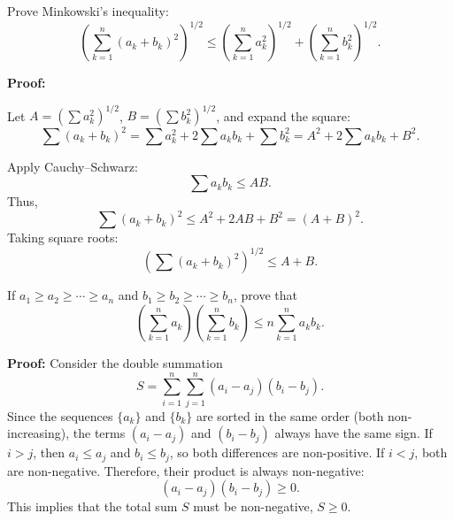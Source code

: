 \begin{problembox}
Prove Minkowski's inequality:
\[
\left( \sum_{k=1}^n (a_k + b_k)^2 \right)^{1/2} \leq \left( \sum_{k=1}^n a_k^2 \right)^{1/2} + \left( \sum_{k=1}^n b_k^2 \right)^{1/2}.
\]
\end{problembox}

\textbf{Proof:}

Let \( A = \left( \sum a_k^2 \right)^{1/2} \), \( B = \left( \sum b_k^2 \right)^{1/2} \), and expand the square:
\[
\sum (a_k + b_k)^2 = \sum a_k^2 + 2\sum a_k b_k + \sum b_k^2 = A^2 + 2\sum a_k b_k + B^2.
\]

Apply Cauchy–Schwarz:
\[
\sum a_k b_k \leq A B.
\]
Thus,
\[
\sum (a_k + b_k)^2 \leq A^2 + 2AB + B^2 = (A + B)^2.
\]
Taking square roots:
\[
\left( \sum (a_k + b_k)^2 \right)^{1/2} \leq A + B.
\]

\begin{problembox}
If \( a_1 \geq a_2 \geq \cdots \geq a_n \) and \( b_1 \geq b_2 \geq \cdots \geq b_n \), prove that
\[
\left( \sum_{k=1}^n a_k \right)\left( \sum_{k=1}^n b_k \right) \leq n \sum_{k=1}^n a_k b_k.
\]
\end{problembox}

\textbf{Proof:}
Consider the double summation
\[ S = \sum_{i=1}^n \sum_{j=1}^n (a_i - a_j)(b_i - b_j). \]
Since the sequences $\{a_k\}$ and $\{b_k\}$ are sorted in the same order (both non-increasing), the terms $(a_i - a_j)$ and $(b_i - b_j)$ always have the same sign. If $i>j$, then $a_i \le a_j$ and $b_i \le b_j$, so both differences are non-positive. If $i<j$, both are non-negative. Therefore, their product is always non-negative:
\[ (a_i - a_j)(b_i - b_j) \geq 0. \]
This implies that the total sum $S$ must be non-negative, $S \geq 0$.

